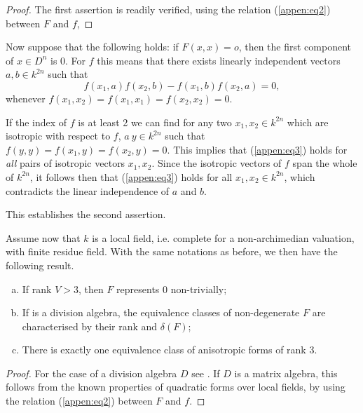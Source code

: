 \begin{proof}
The first assertion is readily verified, using the relation (\ref{appen:eq2})
between $F$ and $f$, 
\end{proof}

Now suppose that the following holds: if $F(x,x)=o$, then the first
component of $x \in D^n$ is $0$. For $f$ this means that there exists
linearly independent vectors $a,b \in k^{2n}$ such that  
\begin{equation*}
f(x_1,a) f(x_2,b)-f(x_1,b)f(x_2,a)=0, \tag{3}\label{appen:eq3}
\end{equation*}
whenever $f(x_1,x_2)=f(x_1,x_1)=f(x_2,x_2)=0$.

If the index of $f$ is at least 2 we can find for any two $x_1,x_2
\in k^{2n}$ which are isotropic with respect to $f$, $a~ y \in k^{2n}$
such that\pageoriginale $f(y,y)=f(x_1,y)=f(x_2,y)=0$. This implies
that (\ref{appen:eq3}) holds 
for \textit{all} pairs of isotropic vectors $x_1,x_2$. Since the
isotropic vectors of $f$ span the whole of $k^{2n}$, it follows then
that (\ref{appen:eq3}) holds for all $x_1,x_2 \in k^{2n}$, which contradicts the
linear independence of $a$ and $b$. 

This establishes the second assertion.

\medskip
{}

Assume now that $k$ is a local field, i.e. complete for a
non-archime\-dian valuation, with finite residue field. With the same
notations as before, we then have the following result.   

\setcounter{section}{2}
\setcounter{lemma}{0}
\begin{lemma}\label{appen:lem2.1}%
\begin{enumerate}[(a)] 
\item  If rank  $ V > 3$, then $F$ represents 0 non-trivially; 

\item If is a division algebra, the equivalence classes of
  non-degenerate $F$ are characterised by their rank and
  $\delta (F)$;  

\item There is exactly one equivalence class of anisotropic forms
  of rank 3.  
\end{enumerate}
\end{lemma}

\begin{proof}
For the case of a division algebra $D$ see \cite{keyTs}. If $D$ is a matrix
algebra, this follows from the known properties of quadratic forms
over local fields, by using the relation (\ref{appen:eq2}) between
$F$ and $f$.   
\end{proof}

